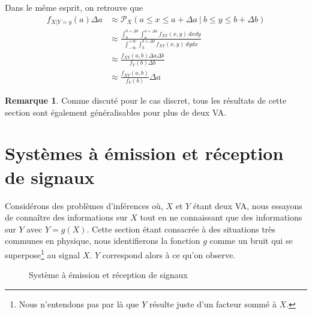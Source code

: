 \documentclass[a4paper,12pt]{report}
\theoremstyle{definition}
\renewcommand{\(}{\left(}
\renewcommand{\)}{\right)}
\renewcommand{\P}{\mathcal{P}}
\newtheorem{rmk}[thm]{Remarque}
\begin{document}
        Dans le même esprit, on retrouve que
        \begin{align*}
            f_{X|Y=y}(a)\Delta a &\approx \P_X(a\leq x\leq a+\Delta a~|~b\leq y\leq b+\Delta b)\\ 
            & \approx \frac{\int_{b}^{b+\Delta b}\int_{a}^{a+\Delta a}f_{XY}(x,y)~dxdy}{\int_{-\infty}^{+\infty}\int_{b}^{b+\Delta b}f_{XY}(x,y)~dydx}\\
            &\approx \frac{f_{XY}(a,b)\Delta a\Delta b}{f_Y(b)\Delta b}\\
            &\approx \frac{f_{XY}(a,b)}{f_Y(b)}\Delta a
        \end{align*}
        
        \begin{rmk}
            Comme discuté pour le cas discret, tous les résultats de cette section sont également généralisables pour plus de deux VA.
        \end{rmk}
    
    \section{Systèmes à émission et réception de signaux}
    
        Considérons des problèmes d'inférences où, $X$ et $Y$ étant deux VA, nous essayons de connaître des informations sur $X$ tout en ne connaissant que des informations sur $Y$ avec $Y = g(X)$. Cette section étant consacrée à des situations très communes en physique, nous identifierons la fonction $g$ comme un bruit qui se superpose\footnote{Nous n'entendons pas par là que $Y$ résulte juste d'un facteur sommé à $X$.} au signal $X$. $Y$ correspond alors à ce qu'on observe.
        
        \begin{figure}[H]
            \centering
            \caption{Système à émission et réception de signaux}
        \end{figure}
        
\end{document}

